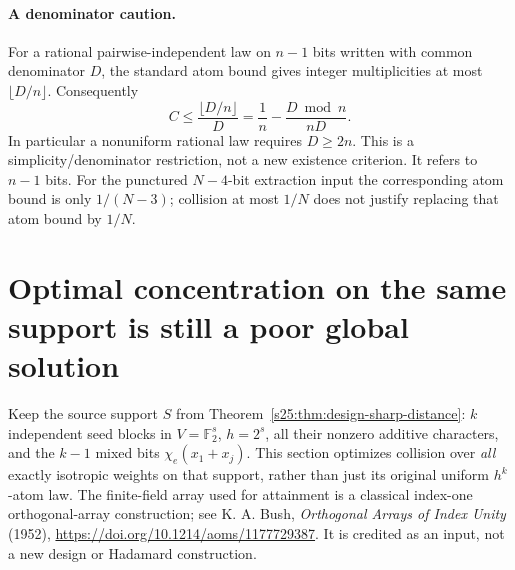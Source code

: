 \paragraph{A denominator caution.}
For a rational pairwise-independent law on $n-1$ bits written with
common denominator $D$, the standard atom bound gives integer
multiplicities at most $\lfloor D/n\rfloor$. Consequently
\[
 C\le\frac{\lfloor D/n\rfloor}{D}
 =\frac1n-\frac{D\bmod n}{nD}.
\]
In particular a nonuniform rational law requires $D\ge2n$.
This is a simplicity/denominator restriction, not a new existence
criterion. It refers to $n-1$ bits. For the punctured $N-4$-bit extraction
input the corresponding atom bound is only $1/(N-3)$; collision at most
$1/N$ does not justify replacing that atom bound by $1/N$.
\section{Optimal concentration on the same support is still a poor global solution}
\label{s25:sec:design-concentration}
Keep the source support $S$ from Theorem~\ref{s25:thm:design-sharp-distance}:
$k$ independent seed blocks in $V=\mathbb F_2^s$, $h=2^s$, all their
nonzero additive characters, and the $k-1$ mixed bits
$\chi_e(x_1+x_j)$. This section optimizes collision over \emph{all}
exactly isotropic weights on that support, rather than just its original
uniform $h^k$-atom law. The finite-field array used for attainment is a
classical index-one orthogonal-array construction; see K. A. Bush,
\emph{Orthogonal Arrays of Index Unity} (1952),
\url{https://doi.org/10.1214/aoms/1177729387}. It is credited as an
input, not a new design or Hadamard construction.


